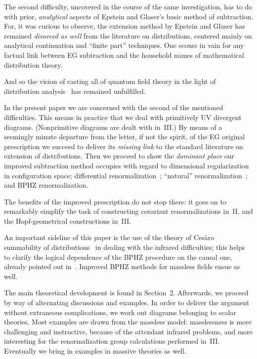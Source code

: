 \documentclass[a4paper,12pt]{article}
\providecommand{\7}{\dagger}           %
\theoremstyle{plain}
\theoremstyle{definition}
\begin{document}
The second difficulty, uncovered in the course of the same
investigation, has to do with prior, \textit{analytical} aspects of
Epstein and Glaser's basic method of subtraction. For, it was curious
to observe, the extension method by Epstein and Glaser has remained
\textit{divorced as well} from the literature on distributions,
centered mainly on analytical continuation and ``finite part''
techniques. One scours in vain for any factual link between EG
subtraction and the household names of mathematical distribution
theory.

And so the vision of casting all of quantum field theory in the light
of distribution analysis~\cite{Guetti,BP} has remained unfulfilled.

In the present paper we are concerned with the second of the mentioned
difficulties. This means in practice that we deal with primitively UV
divergent diagrams. (Nonprimitive diagrams are dealt with in~III.) By
means of a seemingly minute departure from the letter, if not the
spirit, of the EG original prescription we succeed to deliver its
\textit{missing link} to the standard literature on extension of
distributions. Then we proceed to show the \textit{dominant place} our
improved subtraction method occupies with regard to dimensional
regularization in configuration space; differential
renormalization~\cite{FJL}; ``natural'' renormalization~\cite{NR}; and
BPHZ renormalization.

The benefits of the improved prescription do not stop there: it goes
on to remarkably simplify the task of constructing covariant
renormalizations in~II, and the Hopf-geometrical constructions in~III.

An important sideline of this paper is the use of the theory of
Ces\`aro summability of distributions~\cite{Odysseus,CesarRicardo} in
dealing with the infrared difficulties; this helps to clarify the
logical dependence of the BPHZ procedure on the causal one, already
pointed out in~\cite{PrangeI}. Improved BPHZ methods for massless
fields ensue as well.

The main theoretical development is found in Section~2. Afterwards, we
proceed by way of alternating discussions and examples. In order to
deliver the argument without extraneous complications, we work out
diagrams belonging to scalar theories. Most examples are drawn from
the massless \coordHE{} model: masslessness is more challenging and
instructive, because of the attendant infrared problems, and more
interesting for the renormalization group calculations performed
in~III. Eventually we bring in examples in massive theories as well.
\end{document}
